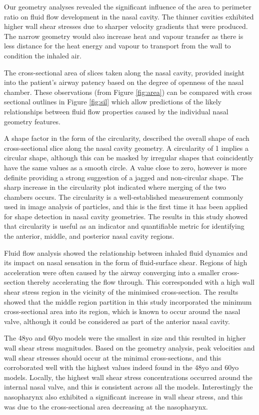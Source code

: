 Our geometry analyses revealed the significant influence of the area to perimeter ratio on fluid flow development in the nasal cavity. The thinner cavities exhibited higher wall shear stresses due to sharper velocity gradients that were produced. The narrow geometry would also increase heat and vapour transfer as there is less distance for the heat energy and vapour to transport from the wall to condition the inhaled air.

The cross-sectional area of slices taken along the nasal cavity, provided insight into the patient’s airway patency based on the degree of openness of the nasal chamber. These observations (from Figure \ref{fig:area}) can be compared with cross sectional outlines in Figure \ref{fig:sil} which allow predictions of the likely relationships between fluid flow properties caused by the individual nasal geometry features.

A shape factor in the form of the circularity,   described the overall shape of each cross-sectional slice along the nasal cavity geometry. A circularity of 1 implies a circular shape, although this can be masked by irregular shapes that coincidently have the same values as a smooth circle. A value close to zero, however is more definite providing a strong suggestion of a jagged and non-circular shape. The sharp increase in the circularity plot indicated where merging of the two chambers occurs. The circularity is a well-established measurement commonly used in image analysis of particles, and this is the first time it has been applied for shape detection in nasal cavity geometries. The results in this study showed that circularity is useful as an indicator and quantifiable metric for identifying the anterior, middle, and posterior nasal cavity regions.

Fluid flow analysis showed the relationship between inhaled fluid dynamics and its impact on nasal sensation in the form of fluid-surface shear. Regions of high acceleration were often caused by the airway converging into a smaller cross-section thereby accelerating the flow through.  This corresponded with a high wall shear stress region in the vicinity of the minimised cross-section. The results showed that the middle region partition in this study incorporated the minimum cross-sectional area into its region, which is known to occur around the nasal valve, although it could be considered as part of the anterior nasal cavity.

The 48yo and 60yo models were the smallest in size and this resulted in higher wall shear stress magnitudes. Based on the geometry analysis, peak velocities and wall shear stresses should occur at the minimal cross-sections, and this corroborated well with the highest values indeed found in the 48yo and 60yo models. Locally, the highest wall shear stress concentrations occurred around the internal nasal valve, and this is consistent across all the models. Interestingly the nasopharynx also exhibited a significant increase in wall shear stress, and this was due to the cross-sectional area decreasing at the nasopharynx.

